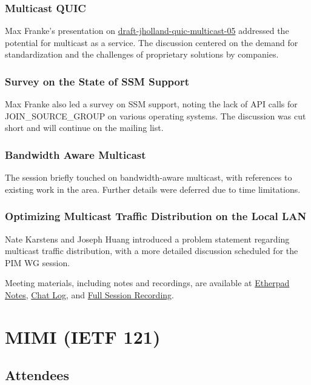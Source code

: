 \documentclass{article}
\begin{document}
\subsubsection{Multicast QUIC}
Max Franke's presentation on \href{https://datatracker.ietf.org/doc/html/draft-jholland-quic-multicast-05}{draft-jholland-quic-multicast-05} addressed the potential for multicast as a service. The discussion centered on the demand for standardization and the challenges of proprietary solutions by companies.

\subsubsection{Survey on the State of SSM Support}
Max Franke also led a survey on SSM support, noting the lack of API calls for JOIN\_SOURCE\_GROUP on various operating systems. The discussion was cut short and will continue on the mailing list.

\subsubsection{Bandwidth Aware Multicast}
The session briefly touched on bandwidth-aware multicast, with references to existing work in the area. Further details were deferred due to time limitations.

\subsubsection{Optimizing Multicast Traffic Distribution on the Local LAN}
Nate Karstens and Joseph Huang introduced a problem statement regarding multicast traffic distribution, with a more detailed discussion scheduled for the PIM WG session.

Meeting materials, including notes and recordings, are available at \href{https://notes.ietf.org/notes-ietf-121-mboned#}{Etherpad Notes}, \href{https://zulip.ietf.org/#narrow/stream/101-mboned/topic/ietf-121}{Chat Log}, and \href{https://meetecho-player.ietf.org/playout/?session=IETF121-MBONED-20241106-1500}{Full Session Recording}.



\newpage

\section{MIMI (IETF 121)}

\subsection{Attendees}
\end{document}
